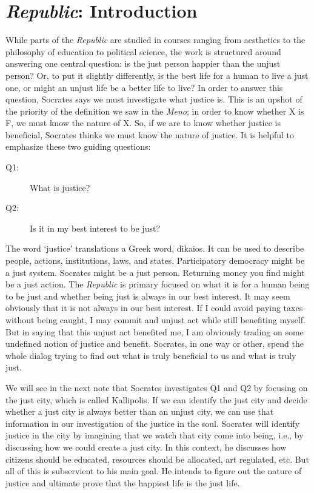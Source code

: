 \documentclass[oneside]{article}
\begin{document}
\section*{\emph{Republic}: Introduction}

While parts of the \emph{Republic} are studied in courses ranging from aesthetics to the philosophy of education to political science, the work is structured around answering one central question: is the just person happier than the unjust person? Or, to put it slightly differently, is the best life for a human to live a just one, or might an unjust life be a better life to live? In order to answer this question, Socrates says we must investigate what justice is. This is an upshot of the priority of the definition we saw in the \emph{Meno}; in order to know whether X is F, we must know the nature of X. So, if we are to know whether justice is beneficial, Socrates thinks we must know the nature of justice. It is helpful to emphasize these two guiding questions: 

\begin{description}
\item[Q1:] What is justice? 
\item[Q2:] Is it in my best interest to be just? 
\end{description}
The word `justice' translations a Greek word, dikaios. It can be used to describe people, actions, institutions, laws, and states. Participatory democracy might be a just system. Socrates might be a just person. Returning money you find might be a just action. The \emph{Republic} is primary focused on what it is for a human being to be just and whether being just is always in our best interest. It may seem obviously that it is not always in our best interest. If I could avoid paying taxes without being caught, I may commit and unjust act while still benefiting myself. But in saying that this unjust act benefited me, I am obviously trading on some undefined notion of justice and benefit. Socrates, in one way or other, spend the whole dialog trying to find out what is truly beneficial to us and what is truly just. 

 We will see in the next note that Socrates investigates Q1 and Q2 by focusing on the just city, which is called Kallipolis. If we can identify the just city and decide whether a just city is always better than an unjust city, we can use that information in our investigation of the justice in the soul. Socrates will identify justice in the city by imagining that we watch that city come into being, i.e., by discussing how we could create a just city. In this context, he discusses how citizens should be educated, resources should be allocated, art regulated, etc. But all of this is subservient to his main goal. He intends to figure out the nature of justice and ultimate prove that the happiest life is the just life. 
\end{document}
